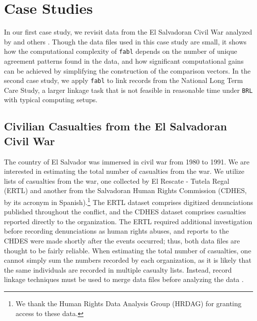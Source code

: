 \documentclass[ba]{imsart}
\begin{document}
	\section{Case Studies}
	\label{sec:case-studies}
	
	In our first case study, we revisit data from the El Salvadoran Civil War analyzed by \cite{sadinle_bayesian_2017} and others \citep{lum2013applications, jewell2018accounting}. Though the data files used in this case study are small, it shows how the computational complexity of \texttt{fabl} depends on the number of unique agreement patterns found in the data, and how significant computational gains can be achieved by simplifying the construction of the comparison vectors. In the second case study, we apply \texttt{fabl} to link records from the National Long Term Care Study, a larger linkage task that is not feasible in reasonable time under \texttt{BRL} with typical computing setups. 
	
	\subsection{Civilian Casualties from the El Salvadoran Civil War}
	\label{el_salvador}
	
	The country of El Salvador was immersed in civil war from 1980 to 1991. We are interested in estimating the total number of casualties from the war. We utilize lists of casualties from the war, one collected by El Rescate - Tutela Regal (ERTL)\citep{howland2008rescate} and another from the Salvadoran Human Rights Commission (CDHES, by its acronym in Spanish)\citep{ball2000salvadoran}.\footnote{We thank the Human Rights Data Analysis Group (HRDAG) for granting access to these data.} The ERTL dataset comprises digitized denunciations published throughout the conflict, and the CDHES dataset comprises casualties reported directly to the organization. The ERTL required additional investigation before recording denunciations as human rights abuses, and reports to the CHDES were made shortly after the events occurred; thus, both data files are thought to be fairly reliable. When estimating the total number of casualties, one cannot simply sum the numbers recorded by each organization, as it is likely that the same individuals are recorded in multiple casualty lists. Instead, record linkage techniques must be used to merge data files before analyzing the data \citep{lum2013applications}. 
	
\end{document}
